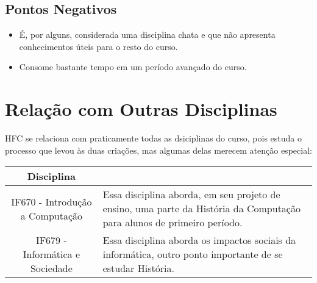 \documentclass{article}
\begin{document}
\subsection{Pontos Negativos}

\begin{itemize}
    \item É, por alguns, considerada uma disciplina chata e que não apresenta conhecimentos úteis para o resto do curso.
    \item Consome bastante tempo em um período avançado do curso.
    
\end{itemize}

\section{Relação com Outras Disciplinas}

HFC se relaciona com praticamente todas as dsiciplinas do curso, pois estuda o processo que levou às duas criações, mas algumas delas merecem atenção especial:

\begin{table}[h]
    \centering
    \begin{tabular}{||c|m{8.5cm}||}
    \hline
     Disciplina & \\
     \hline
     IF670 - Introdução a Computação & Essa disciplina aborda, em seu projeto de ensino, uma parte da História da Computação para alunos de primeiro período. \cite{cinwikiif668}\\
     \hline
     IF679 - Informática e Sociedade & Essa disciplina aborda os impactos sociais da informática, outro ponto importante de se estudar História. \cite{cinwikiif679}\\
     \hline
     
     
        
    \end{tabular}
    
    
    \label{tab:relacoes}
\end{table}



\nocite{*}
\end{document}
